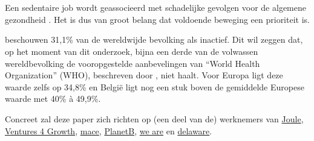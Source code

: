 
\chapter{}%
\label{ch:inleiding}


\section{}%
\label{sec:probleemstelling}

Een sedentaire job wordt geassocieerd met schadelijke gevolgen voor de algemene gezondheid \autocite{Buckley2015}. Het is dus van groot belang dat voldoende beweging een prioriteit is.

\textcite{Hallal2012} beschouwen 31,1\% van de wereldwijde bevolking als inactief. Dit wil zeggen dat, op het moment van dit onderzoek, bijna een derde van de volwassen wereldbevolking de vooropgestelde aanbevelingen van ``World Health Organization'' (WHO), beschreven door \textcite{Bull2020}, niet haalt. Voor Europa ligt deze waarde zelfs op 34,8\% en België ligt nog een stuk boven de gemiddelde Europese waarde met 40\% à 49,9\%.

Concreet zal deze paper zich richten op (een deel van de) werknemers van \href{https://en.joule.be/}{Joule}, \href{https://www.ventures4growth.com/en}{Ventures 4 Growth}, \href{https://www.mace-legal.com/}{mace}, \href{https://planetb.life/en}{PlanetB}, \href{https://www.we-are.be/}{we are} en \href{https://www.delaware.pro/en-be}{delaware}.


